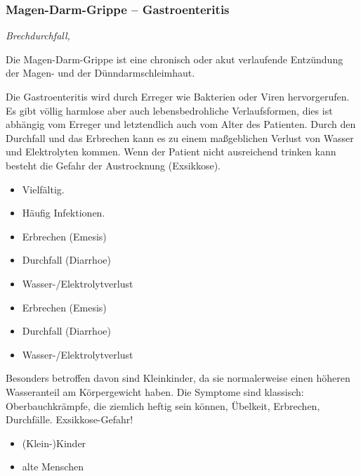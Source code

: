 \subsubsection{Magen-Darm-Grippe -- Gastroenteritis}

\emph{ Brechdurchfall, }

Die Magen-Darm-Grippe ist eine chronisch oder akut
verlaufende Entzündung der Magen- und der Dünndarmschleimhaut. 

{
Die Gastroenteritis wird durch Erreger
wie Bakterien oder Viren hervorgerufen. Es gibt völlig
harmlose aber auch lebensbedrohliche Verlaufsformen, dies ist abhängig vom Erreger und
letztendlich auch vom Alter des Patienten. Durch den
Durchfall und das Erbrechen kann es zu einem maßgeblichen
Verlust von Wasser und Elektrolyten kommen. Wenn der Patient
nicht ausreichend trinken kann besteht die Gefahr der Austrocknung (Exsikkose).
}{
\begin{itemize}
  \item Vielfältig.
  \item Häufig Infektionen.
\end{itemize}
}{}{}{}


{
\begin{itemize}
    \item Erbrechen (Emesis)
    \item Durchfall (Diarrhoe)
    \item Wasser-/Elektrolytverlust
\end{itemize}
}{
\begin{itemize}
    \item Erbrechen (Emesis)
    \item Durchfall (Diarrhoe)
    \item Wasser-/Elektrolytverlust
\end{itemize}
}{}{}{}

{%
Besonders betroffen davon sind Kleinkinder, da sie
normalerweise einen höheren Wasseranteil am Körpergewicht
haben.  Die Symptome sind klassisch: Oberbauchkrämpfe,
die ziemlich heftig sein können, Übelkeit, Erbrechen, Durchfälle.
Exsikkose-Gefahr! 
}{
\begin{itemize}
    \item (Klein-)Kinder
    \item alte Menschen
\end{itemize}
}{}{}{}



